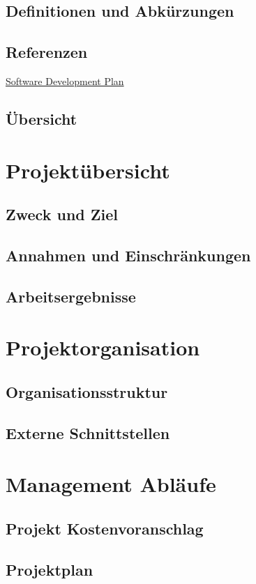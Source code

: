 \documentclass[12pt,a4paper,onecolumn]{article}
\begin{document}
\subsection{Definitionen und Abkürzungen}
\subsection{Referenzen}
\href{https://sceweb.uhcl.edu/helm/RationalUnifiedProcess/webtmpl/templates/mgmnt/rup_sdpln_sp.htm}{Software Development Plan}
\subsection{Übersicht}
\section{Projektübersicht}
\subsection{Zweck und Ziel}
\subsection{Annahmen und Einschränkungen}
\subsection{Arbeitsergebnisse}

\section{Projektorganisation}
\subsection{Organisationsstruktur}
\subsection{Externe Schnittstellen}

\section{Management Abläufe}
\subsection{Projekt Kostenvoranschlag}
\subsection{Projektplan}
\end{document}
